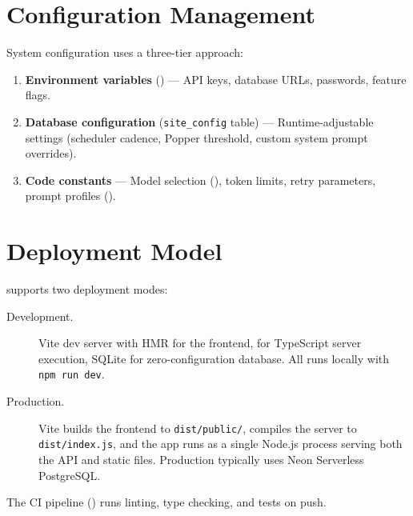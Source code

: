 \section{Configuration Management}
\label{sec:arch:config}

System configuration uses a three-tier approach:

\begin{enumerate}
  \item \textbf{Environment variables} () --- API keys, database URLs, passwords, feature flags.
  \item \textbf{Database configuration} (\texttt{site\_config} table) --- Runtime-adjustable settings (scheduler cadence, Popper threshold, custom system prompt overrides).
  \item \textbf{Code constants} --- Model selection (), token limits, retry parameters, prompt profiles ().
\end{enumerate}

\section{Deployment Model}
\label{sec:arch:deployment}

\autoscholar supports two deployment modes:

\begin{description}
  \item[Development.] Vite dev server with HMR for the frontend,  for TypeScript server execution, SQLite for zero-configuration database. All runs locally with \texttt{npm run dev}.
  \item[Production.] Vite builds the frontend to \texttt{dist/public/},  compiles the server to \texttt{dist/index.js}, and the app runs as a single Node.js process serving both the API and static files. Production typically uses Neon Serverless PostgreSQL.
\end{description}

The CI pipeline () runs linting, type checking, and tests on push.
